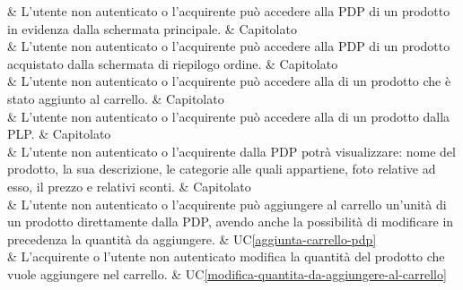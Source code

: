  & L'utente non autenticato o l'acquirente può accedere alla PDP di un prodotto in evidenza dalla schermata principale. & Capitolato \\

 & L'utente non autenticato o l'acquirente può accedere alla PDP di un prodotto acquistato dalla schermata di riepilogo ordine. & Capitolato \\

 & L'utente non autenticato o l'acquirente può accedere alla  di un prodotto che è stato aggiunto al carrello. & Capitolato \\

 & L'utente non autenticato o l'acquirente può accedere alla  di un prodotto dalla PLP. & Capitolato \\

 & L'utente non autenticato o l'acquirente dalla PDP potrà visualizzare: nome del prodotto, la sua descrizione, le categorie alle quali appartiene, foto relative ad esso, il prezzo e relativi sconti. & Capitolato \\

 & L'utente non autenticato o l'acquirente può aggiungere al carrello un'unità di un prodotto direttamente dalla PDP, avendo anche la possibilità di modificare in precedenza la quantità da aggiungere. & UC\ref{aggiunta-carrello-pdp} \\

 & L'acquirente o l'utente non autenticato modifica la quantità del prodotto che vuole aggiungere nel carrello. & UC\ref{modifica-quantita-da-aggiungere-al-carrello} \\

